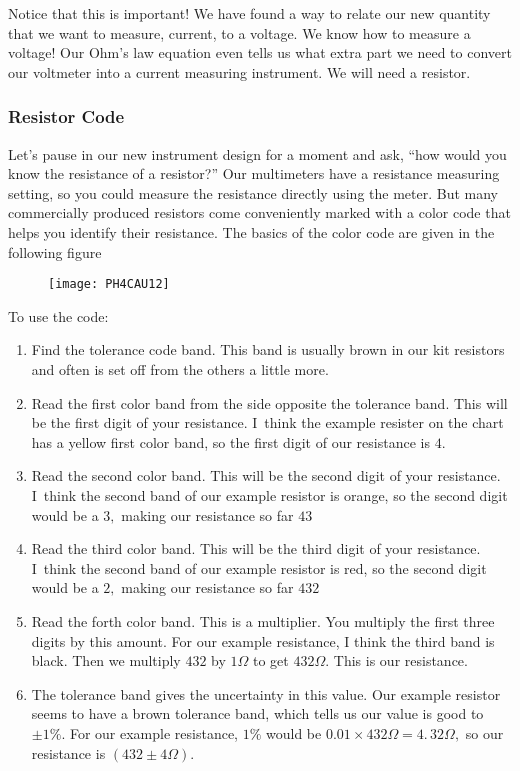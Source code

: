 Notice that this is important! We have found a way to relate our new quantity that we want to measure, current, to a voltage. We know how to measure a voltage! Our Ohm's law equation even tells us what extra part we need to convert our voltmeter into a current measuring instrument. We will need a resistor.

\subsubsection{Resistor Code}

Let's pause in our new instrument design for a moment and ask, ``how would you know the resistance of a resistor?'' Our multimeters have a resistance measuring setting, so you could measure the resistance directly using the meter. But many commercially produced resistors come conveniently marked with a color code that helps you identify their resistance. The basics of the color code are given in the following figure\bigskip 

\begin{figure}[h!]
	\centering
    \texttt{[image: PH4CAU12]}
\end{figure}

To use the code:

\begin{enumerate}
    \item Find the tolerance code band. This band is usually brown in our kit resistors and often is set off from the others a little more.

    \item Read the first color band from the side opposite the tolerance band. This will be the first digit of your resistance. I\ think the example resister on the chart has a yellow first color band, so the first digit of our resistance is $4.$

    \item Read the second color band. This will be the second digit of your resistance. I\ think the second band of our example resistor is orange, so the second digit would be a $3,$ making our resistance so far $43$

    \item Read the third color band. This will be the third digit of your resistance. I\ think the second band of our example resistor is red, so the second digit would be a $2,$ making our resistance so far $432$

    \item Read the forth color band. This is a multiplier. You multiply the first three digits by this amount. For our example resistance, I think the third band is black. Then we multiply $432$ by $1\unit{\Omega}$ to get $432\unit{\Omega}.$ This is our resistance.

    \item The tolerance band gives the uncertainty in this value. Our example resistor seems to have a brown tolerance band, which tells us our value is good to $\pm 1\%.$ For our example resistance, $1\%$ would be $0.01\times 432\unit{\Omega}=\allowbreak 4.\,\allowbreak 32\unit{\Omega},$ so our resistance is $\left( 432\pm 4\unit{\Omega}\right) .$
\end{enumerate}


